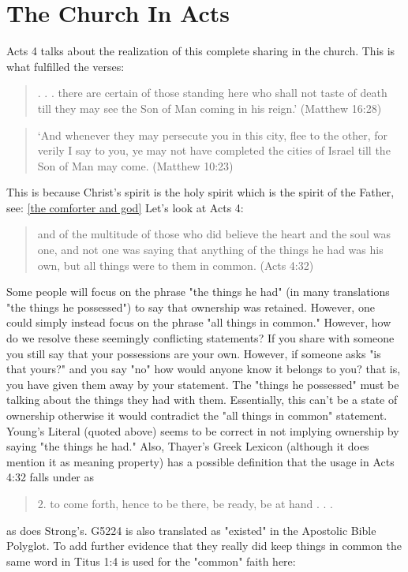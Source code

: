 \documentclass[11pt]{article}
\begin{document}
\section{The Church In Acts}
\indent Acts 4 talks about the realization of this complete sharing in the church. This is what fulfilled the verses: 
\begin{quote}
. . . there are certain of those standing here who shall not taste of death till they may see the Son of Man coming in his reign.' (Matthew 16:28) 
\end{quote}
\begin{quote}
`And whenever they may persecute you in this city, flee to the other, for verily I say to you, ye may not have completed the cities of Israel till the Son of Man may come. (Matthew 10:23)
\end{quote} This is because Christ's spirit is the holy spirit which is the spirit of the Father, see: \ref{the comforter and god} 
Let's look at Acts 4:
\begin{quote}
and of the multitude of those who did believe the heart and the soul was one, and not one was saying that anything of the things he had was his own, but all things were to them in common. (Acts 4:32)
\end{quote}
Some people will focus on the phrase "the things he had" (in many translations "the things he possessed") to say that ownership was retained. However, one could simply instead focus on the phrase "all things in common." However, how do we resolve these seemingly conflicting statements? If you share with someone you still say that your possessions are your own. However, if someone asks "is that yours?" and you say "no" how would anyone know it belongs to you? that is, you have given them away by your statement. The "things he possessed" must be talking about the things they had with them. Essentially, this can't be a state of ownership otherwise it would contradict the "all things in common" statement. 
Young's Literal (quoted above) seems to be correct in not implying ownership by saying "the things he had." Also, Thayer's Greek Lexicon (although it does mention it as meaning property) has a possible definition that the usage in Acts 4:32 falls under as 
\begin{quote}
2. to come forth, hence to be there, be ready, be at hand . . .
\end{quote}
 as does Strong's.\cite{possessions thayer's strong's} G5224 is also translated as "existed" in the Apostolic Bible Polyglot.\cite{G5224 apostolic bible polyglot} To add further evidence that they really did keep things in common the same word in Titus 1:4 is used for the "common" faith here: 
\end{document}
